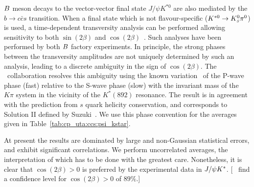 
\label{sec:cp_uta:ccs:vv}

$B$ meson decays to the vector-vector final state $J/\psi K^{*0}$
are also mediated by the $b \to c \bar c s$ transition.
When a final state which is not flavour-specific ($K^{*0} \to K^0_{\scriptscriptstyle S} \pi^0$) is used,
a time-dependent transversity analysis can be performed 
allowing sensitivity to both 
$\sin(2\beta)$ and $\cos(2\beta)$~\cite{Dunietz:1990cj}.
Such analyses have been performed by both $B$ factory experiments.
In principle, the strong phases between the transversity amplitudes
are not uniquely determined by such an analysis, 
leading to a discrete ambiguity in the sign of $\cos(2\beta)$.
The \babar\ collaboration resolves 
this ambiguity using the known variation~\cite{Aston:1987ir}
of the P-wave phase (fast) relative to the S-wave phase (slow) 
with the invariant mass of the $K\pi$ system 
in the vicinity of the $K^*(892)$ resonance. 
The result is in agreement with the prediction from 
$s$ quark helicity conservation,
and corresponds to Solution II defined by Suzuki~\cite{Suzuki:2001za}.
We use this phase convention for the averages given in 
Table~\ref{tab:cp_uta:ccs:psi_kstar}.



At present the results are dominated by 
large and non-Gaussian statistical errors,
and exhibit significant correlations.
We perform uncorrelated averages, 
the interpretation of which has to be done with the greatest care. 
Nonetheless, it is clear that $\cos(2\beta)>0$ is preferred 
by the experimental data in $J/\psi K^*$.
[\babar~\cite{Aubert:2004cp} 
find a confidence level for $\cos(2\beta)>0$ of $89\%$.]

